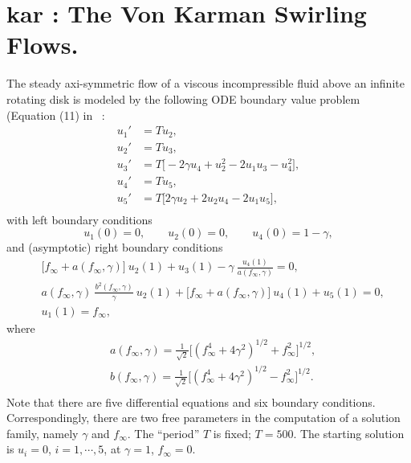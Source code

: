 \documentclass[12pt]{report}
\begin{document}
\section{ kar : The Von Karman Swirling Flows.} \label{sec:Demos_kar}
The steady axi-symmetric flow of a viscous incompressible fluid
above an infinite rotating disk is modeled by the following 
ODE boundary value problem (Equation (11) in
 \citeyear{LeKe:80}~:
\begin{equation} \begin{array}{cl}
  u_1' &= T u_2,  \\
  u_2' &= T u_3,  \\
  u_3' &= T \bigl[ -2 \gamma u_4 + u_2^2 - 2 u_1 u_3 - u_4^2 \bigr], \\
  u_4' &= T u_5, \\
  u_5' &= T \bigl[ 2 \gamma u_2 + 2 u_2 u_4 - 2 u_1 u_5 \bigr], \\
\end{array} \end{equation}
with left boundary conditions
$$ u_1(0)=0, \qquad u_2(0)=0, \qquad u_4(0)=1-\gamma, $$
and (asymptotic) right boundary conditions
\begin{equation} \begin{array}{cl}
  & \bigl[ f_\infty + a(f_\infty,\gamma) \bigr] ~ u_2(1) + u_3(1)
  - \gamma ~ \frac{ u_4(1) }{ a(f_\infty,\gamma) } = 0,  \\
  & a(f_\infty,\gamma)~ \frac{ b^2(f_\infty,\gamma) }{ \gamma } ~u_2(1)
  + \bigl[ f_\infty + a(f_\infty,\gamma) \bigr] ~u_4(1) 
  + u_5(1) = 0, \\
 & u_1(1) = f_\infty,
 \end{array} \end{equation}
where
\begin{equation} \begin{array}{cl}
 & a(f_\infty,\gamma) = \frac{1 }{ \sqrt{2} }
  \bigl[ (f_\infty^4 + 4 \gamma^2)^{1/2} + f_\infty^2 \bigr]^{1/2}, \\
 & b(f_\infty,\gamma) = \frac{1 }{ \sqrt{2} }
  \bigl[ (f_\infty^4 + 4 \gamma^2)^{1/2} - f_\infty^2 \bigr]^{1/2}.  \\
\end{array} \end{equation}
Note that there are five differential equations and six boundary conditions.
Correspondingly, there are two free parameters in the computation of a 
solution family, namely $\gamma$ and $f_\infty$.
The ``period'' $T$ is fixed; $T=500$.
The starting solution is $u_i=0$, $i=1,\cdots,5$, 
at $\gamma=1$, $f_\infty=0$.
\end{document}
